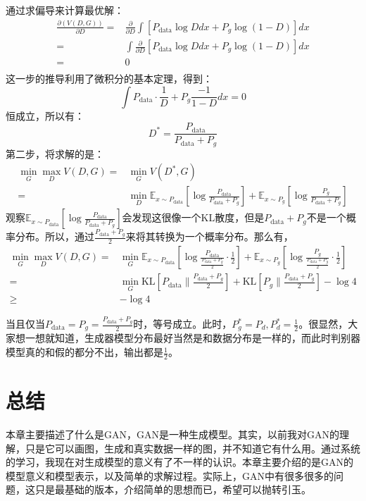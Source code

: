 \documentclass[a4paper]{article}
\begin{document}
通过求偏导来计算最优解：
\begin{equation}
    \begin{split}
        \frac{\partial (V(D,G))}{\partial D} = & \frac{\partial}{\partial D} \int \left[ P_{\text{data}} \log D dx + P_g \log(1-D) \right]dx \\
        = &  \int \frac{\partial}{\partial D} \left[ P_{\text{data}} \log D dx + P_g \log(1-D) \right]dx \\
        = & 0 \\
    \end{split}
\end{equation}
这一步的推导利用了微积分的基本定理，得到：
$$
\int P_{\text{data} }\cdot \frac{1}{D} + P_g \frac{-1}{1-D} dx = 0
$$
恒成立，所以有：
\begin{equation}
    D^\ast = \frac{P_{\text{data}}}{P_{\text{data}} + P_{g}}
\end{equation}
第二步，将求解的是：
\begin{equation}
    \begin{split}
        \min_G \max_D V(D,G) = & \min_G V(D^\ast,G) \\
        = & \min_D \mathbb{E}_{x\sim P_{\text{data}}} \left[   \log \frac{P_{\text{data}}}{P_{\text{data}} + P_{g}}\right] + \mathbb{E}_{x\sim P_{g}} \left[   \log \frac{P_g}{P_{\text{data}} + P_{g}}\right]
    \end{split}
\end{equation}
观察$\mathbb{E}_{x\sim P_{\text{data}}} \left[   \log \frac{P_{\text{data}}}{P_{\text{data}} + P_{g}}\right]$会发现这很像一个KL散度，但是$P_{\text{data}} + P_{g}$不是一个概率分布。所以，通过$\frac{P_{\text{data}} + P_{g}}{2}$来将其转换为一个概率分布。那么有，
\begin{equation}
\begin{split}
    \min_G \max_D V(D,G) = & \min_G \mathbb{E}_{x\sim P_{\text{data}}} \left[   \log \frac{P_{\text{data}}}{\frac{P_{\text{data}} + P_{g}}{2}} \cdot \frac{1}{2}\right] + \mathbb{E}_{x\sim P_{g}} \left[   \log \frac{P_g}{\frac{P_{\text{data}} + P_{g}}{2}} \cdot \frac{1}{2}\right] \\
    = & \min_G \text{KL}\left[ P_{\text{data}} \| \frac{P_{\text{data}} + P_{g}}{2} \right] + \text{KL}\left[ P_{g} \| \frac{P_{\text{data}} + P_{g}}{2} \right] - \log 4 \\
    \geq & - \log 4
\end{split}
\end{equation}

当且仅当$P_{\text{data}}  = P_{g} = \frac{P_{\text{data}} + P_{g}}{2}$时，等号成立。此时，$P^\ast_g = P_d,P^\ast_d = \frac{1}{2}$。很显然，大家想一想就知道，生成器模型分布最好当然是和数据分布是一样的，而此时判别器模型真的和假的都分不出，输出都是$\frac{1}{2}$。

\section{总结}
本章主要描述了什么是GAN，GAN是一种生成模型。其实，以前我对GAN的理解，只是它可以画图，生成和真实数据一样的图，并不知道它有什么用。通过系统的学习，我现在对生成模型的意义有了不一样的认识。本章主要介绍的是GAN的模型意义和模型表示，以及简单的求解过程。实际上，GAN中有很多很多的问题，这只是最基础的版本，介绍简单的思想而已，希望可以抛转引玉。
\end{document}
